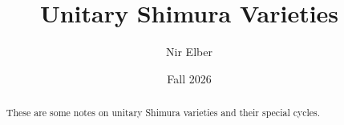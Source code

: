 \documentclass{article}
\title{Unitary Shimura Varieties}
\author{Nir Elber}
\date{Fall 2026}
\begin{document}
\maketitle

\begin{abstract}
	These are some notes on unitary Shimura varieties and their special cycles.
\end{abstract}

\tableofcontents





\nirprintbib
\end{document}
